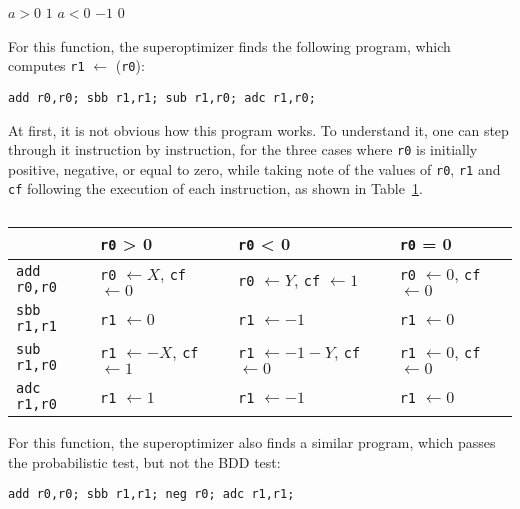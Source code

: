 \documentclass[a4paper,11pt]{kth-mag}
\renewcommand{\gets}{\leftarrow}
\begin{document}
\begin{codebox}
\zi \If $a > 0$
\zi \Do
      \Return $1$
    \End
\zi \If $a < 0$
\zi \Do
      \Return $-1$
    \End
\zi \Return $0$
\end{codebox}

For this function, the superoptimizer finds the following program, which computes \verb|r1| $\gets$ (\verb|r0|):

\begin{verbatim}
add r0,r0; sbb r1,r1; sub r1,r0; adc r1,r0;
\end{verbatim}

At first, it is not obvious how this program works.
To understand it, one can step through it instruction by instruction,
for the three cases where \verb|r0| is initially positive, negative, or equal to zero,
while taking note of the values of \verb|r0|, \verb|r1| and \verb|cf| following the execution of each instruction,
as shown in Table~\ref{tab:sign_correct}.

\begin{table}
\centering
\begin{tabular}{l|lll}
& \verb|r0| > 0
& \verb|r0| < 0
& \verb|r0| = 0 \\
\hline
\verb|add r0,r0|
& \verb|r0| $\gets X$, \verb|cf| $\gets 0$ %
& \verb|r0| $\gets Y$, \verb|cf| $\gets 1$
& \verb|r0| $\gets 0$, \verb|cf| $\gets 0$ \\
\verb|sbb r1,r1|
& \verb|r1| $\gets 0$
& \verb|r1| $\gets -1$
& \verb|r1| $\gets 0$ \\
\verb|sub r1,r0|
& \verb|r1| $\gets -X$, \verb|cf| $\gets 1$
& \verb|r1| $\gets -1-Y$, \verb|cf| $\gets 0$ %
& \verb|r1| $\gets 0$, \verb|cf| $\gets 0$ \\
\verb|adc r1,r0|
& \verb|r1| $\gets 1$
& \verb|r1| $\gets -1$
& \verb|r1| $\gets 0$ \\
\end{tabular}
\caption{}
\label{tab:sign_correct}
\end{table}

For this function, the superoptimizer also finds a similar program, which passes the probabilistic test, but not the BDD test:

\begin{verbatim}
add r0,r0; sbb r1,r1; neg r0; adc r1,r1;
\end{verbatim}
\end{document}
